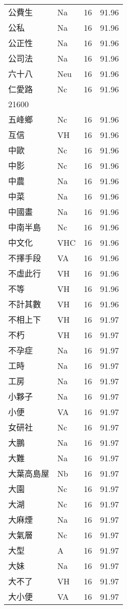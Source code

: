 \documentclass[twocolumn]{book}
\begin{document}
\begin{supertabular}{llrr}
公費生 & Na & 16 &  91.96\\
公私 & Na & 16 &  91.96\\
公正性 & Na & 16 &  91.96\\
公司法 & Na & 16 &  91.96\\
六十八 & Neu & 16 &  91.96\\
仁愛路 & Nc & 16 &  91.96\\
21600\\
五峰鄉 & Nc & 16 &  91.96\\
互信 & VH & 16 &  91.96\\
中歐 & Nc & 16 &  91.96\\
中影 & Nc & 16 &  91.96\\
中農 & Na & 16 &  91.96\\
中菜 & Na & 16 &  91.96\\
中國畫 & Na & 16 &  91.96\\
中南半島 & Nc & 16 &  91.96\\
中文化 & VHC & 16 &  91.96\\
不擇手段 & VA & 16 &  91.96\\
不虛此行 & VH & 16 &  91.96\\
不等 & VH & 16 &  91.96\\
不計其數 & VH & 16 &  91.96\\
不相上下 & VH & 16 &  91.97\\
不朽 & VH & 16 &  91.97\\
不孕症 & Na & 16 &  91.97\\
工時 & Na & 16 &  91.97\\
工房 & Na & 16 &  91.97\\
小夥子 & Na & 16 &  91.97\\
小便 & VA & 16 &  91.97\\
女研社 & Nc & 16 &  91.97\\
大鵬 & Na & 16 &  91.97\\
大難 & Na & 16 &  91.97\\
大葉高島屋 & Nb & 16 &  91.97\\
大園 & Nc & 16 &  91.97\\
大湖 & Nc & 16 &  91.97\\
大麻煙 & Na & 16 &  91.97\\
大氣層 & Nc & 16 &  91.97\\
大型 & A & 16 &  91.97\\
大妹 & Na & 16 &  91.97\\
大不了 & VH & 16 &  91.97\\
大小便 & VA & 16 &  91.97\\

\end{supertabular}
\end{document}
